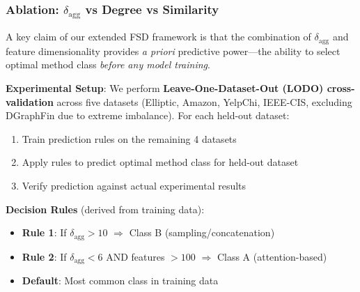 \subsubsection{Ablation: $\delta_{\text{agg}}$ vs Degree vs Similarity}

A key claim of our extended FSD framework is that the combination of $\delta_{\text{agg}}$ and feature dimensionality provides \textit{a priori} predictive power---the ability to select optimal method class \textit{before any model training}.

\textbf{Experimental Setup}: We perform \textbf{Leave-One-Dataset-Out (LODO) cross-validation} across five datasets (Elliptic, Amazon, YelpChi, IEEE-CIS, excluding DGraphFin due to extreme imbalance). For each held-out dataset:
\begin{enumerate}
\item Train prediction rules on the remaining 4 datasets
\item Apply rules to predict optimal method class for held-out dataset
\item Verify prediction against actual experimental results
\end{enumerate}

\textbf{Decision Rules} (derived from training data):
\begin{itemize}
\item \textbf{Rule 1}: If $\delta_{\text{agg}} > 10$ $\Rightarrow$ Class B (sampling/concatenation)
\item \textbf{Rule 2}: If $\delta_{\text{agg}} < 6$ AND features $> 100$ $\Rightarrow$ Class A (attention-based)
\item \textbf{Default}: Most common class in training data
\end{itemize}

